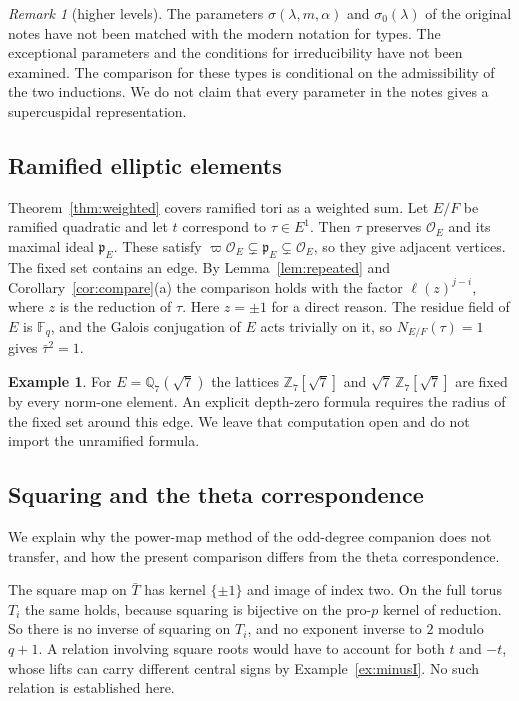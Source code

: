 \documentclass[12pt,letterpaper]{article}
\numberwithin{equation}{section}
\theoremstyle{definition}
\newtheorem{example}[theorem]{Example}
\theoremstyle{remark}
\newtheorem{remarkyr}{Remark}
\newcommand{\OEr}{\mathcal O_E}
\newcommand{\kk}{\mathbb F_q}
\begin{document}
\begin{remarkyr}[higher levels]\label{rem:levels}
The parameters $\sigma(\lambda,m,\alpha)$ and $\sigma_0(\lambda)$ of the original notes have not been matched with the modern notation for types. The exceptional parameters and the conditions for irreducibility have not been examined. The comparison for these types is conditional on the admissibility of the two inductions. We do not claim that every parameter in the notes gives a supercuspidal representation.
\end{remarkyr}

\subsection{Ramified elliptic elements}
Theorem~\ref{thm:weighted} covers ramified tori as a weighted sum. Let $E/F$ be ramified quadratic and let $t$ correspond to $\tau\in E^1$. Then $\tau$ preserves $\OEr$ and its maximal ideal $\mathfrak p_E$. These satisfy $\varpi\OEr\subsetneq\mathfrak p_E\subsetneq\OEr$, so they give adjacent vertices. The fixed set contains an edge. By Lemma~\ref{lem:repeated} and Corollary~\ref{cor:compare}(a) the comparison holds with the factor $\ell(z)^{j-i}$, where $z$ is the reduction of $\tau$. Here $z=\pm1$ for a direct reason. The residue field of $E$ is $\kk$, and the Galois conjugation of $E$ acts trivially on it, so $N_{E/F}(\tau)=1$ gives $\bar\tau^2=1$.

\begin{example}
For $E=\mathbb Q_7(\sqrt7)$ the lattices $\mathbb Z_7[\sqrt7]$ and $\sqrt7\,\mathbb Z_7[\sqrt7]$ are fixed by every norm-one element. An explicit depth-zero formula requires the radius of the fixed set around this edge. We leave that computation open and do not import the unramified formula.
\end{example}

\subsection{Squaring and the theta correspondence}
We explain why the power-map method of the odd-degree companion does not transfer, and how the present comparison differs from the theta correspondence.

The square map on $\bar T$ has kernel $\{\pm1\}$ and image of index two. On the full torus $T_i$ the same holds, because squaring is bijective on the pro-$p$ kernel of reduction. So there is no inverse of squaring on $T_i$, and no exponent inverse to $2$ modulo $q+1$. A relation involving square roots would have to account for both $t$ and $-t$, whose lifts can carry different central signs by Example~\ref{ex:minusI}. No such relation is established here.
\end{document}
